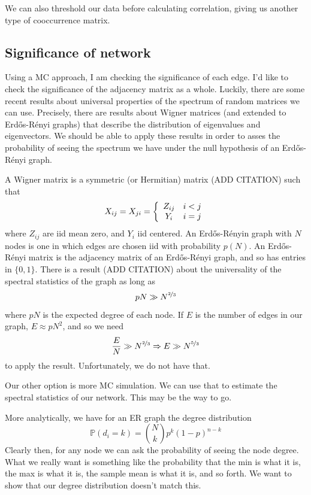 \documentclass[10pt]{article}
\theoremstyle{definition}
\numberwithin{theorem}{section}
\numberwithin{definition}{section}
\numberwithin{lemma}{section}
\numberwithin{corollary}{section}
\numberwithin{clm}{section}
\numberwithin{rmk}{section}
\newcommand{\bP}{\mathbb{P}}
\begin{document}
We can also threshold our data before calculating correlation, giving us another type of cooccurrence matrix.

\subsection{Significance of network}
Using a MC approach, I am checking the significance of each edge. I'd like to check the significance of the adjacency matrix as a whole. Luckily, there are some recent results about universal properties of the spectrum of random matrices we can use. Precisely, there are results about Wigner matrices (and extended to Erd\H{o}s-R\'{e}nyi graphs) that describe the distribution of eigenvalues and eigenvectors. We should be able to apply these results in order to asses the probability of seeing the spectrum we have under the null hypothesis of an Erd\H{o}s-R\'{e}nyi graph.

A Wigner matrix is a symmetric (or Hermitian) matrix (ADD CITATION) such that
\[
X_{ij} = X_{ji} = \left\{\begin{array}{c c}
Z_{ij} & i <j\\
Y_i & i=j
\end{array}\right.
\]
where $Z_{ij}$ are iid mean zero, and $Y_{i}$ iid centered. An Erd\H{o}s-R\'{e}nyin graph with $N$ nodes is one in which edges are chosen iid with probability $p(N)$. An Erd\H{o}s-R\'{e}nyi matrix is the adjacency matrix of an Erd\H{o}s-R\'{e}nyi graph, and so has entries in $\{0,1\}$. There is a result (ADD CITATION) about the universality of the spectral statistics of the graph as long as 
\[
pN \gg N^{\nicefrac{2}{3}}
\]
where $pN$ is the expected degree of each node. If $E$ is the number of edges in our graph, $E \approx pN^2$, and so we need
\[
\frac{E}{N} \gg N^{\nicefrac{2}{3}} \Rightarrow E \gg N^{\nicefrac{5}{3}}
\] 
to apply the result. Unfortunately, we do not have that.

Our other option is more MC simulation. We can use that to estimate the spectral statistics of our network. This may be the way to go. 

More analytically, we have for an ER graph the degree distribution
\[
\bP(d_i = k) = \binom{N}{k}p^k(1-p)^{n-k}
\]
Clearly then, for any node we can ask the probability of seeing the node degree. What we really want is something like the probability that the min is what it is, the max is what it is, the sample mean is what it is, and so forth. We want to show that our degree distribution doesn't match this.
\end{document}
